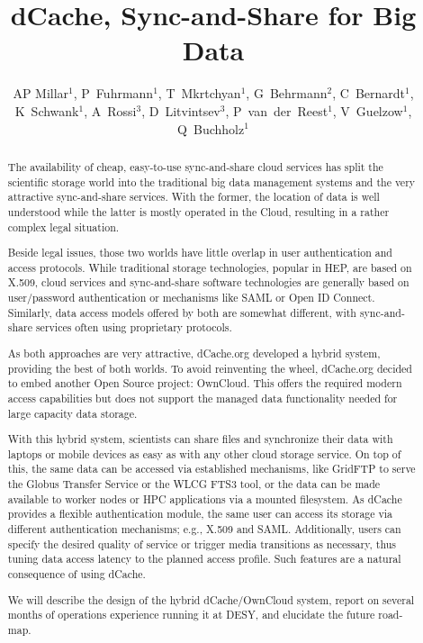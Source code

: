\documentclass[a4paper]{jpconf}
\begin{document}
\title{dCache, Sync-and-Share for Big Data}

\author{AP Millar$^1$, P~Fuhrmann$^1$, T~Mkrtchyan$^1$,
  G~Behrmann$^2$, C~Bernardt$^1$, K~Schwank$^1$, A~Rossi$^3$,
  D~Litvintsev$^3$, P~van~der~Reest$^1$, V~Guelzow$^1$,
  Q~Buchholz$^1$}

\address{$^1$ IT Dept., DESY, Notkestrasse 85, Hamburg, Germany}
\address{$^2$ Gerd Behrmann, Copenhagen, Denmark}
\address{$^3$ Fermilab, Batavia, IL, USA}


\begin{abstract}
The availability of cheap, easy-to-use sync-and-share cloud services
has split the scientific storage world into the traditional big data
management systems and the very attractive sync-and-share
services. With the former, the location of data is well understood
while the latter is mostly operated in the Cloud, resulting in a
rather complex legal situation.

Beside legal issues, those two worlds have little overlap in user
authentication and access protocols. While traditional storage
technologies, popular in HEP, are based on X.509, cloud services and
sync-and-share software technologies are generally based on
user/password authentication or mechanisms like SAML or Open ID
Connect. Similarly, data access models offered by both are somewhat
different, with sync-and-share services often using proprietary
protocols.

As both approaches are very attractive, dCache.org developed a hybrid
system, providing the best of both worlds. To avoid reinventing the
wheel, dCache.org decided to embed another Open Source project:
OwnCloud. This offers the required modern access capabilities but does
not support the managed data functionality needed for large capacity
data storage.

With this hybrid system, scientists can share files and synchronize
their data with laptops or mobile devices as easy as with any other
cloud storage service. On top of this, the same data can be accessed
via established mechanisms, like GridFTP to serve the Globus Transfer
Service or the WLCG FTS3 tool, or the data can be made available to
worker nodes or HPC applications via a mounted filesystem. As dCache
provides a flexible authentication module, the same user can access
its storage via different authentication mechanisms; e.g., X.509 and
SAML. Additionally, users can specify the desired quality of service
or trigger media transitions as necessary, thus tuning data access
latency to the planned access profile. Such features are a natural
consequence of using dCache.

We will describe the design of the hybrid dCache/OwnCloud system,
report on several months of operations experience running it at DESY,
and elucidate the future road-map.
\end{abstract}
\end{document}
